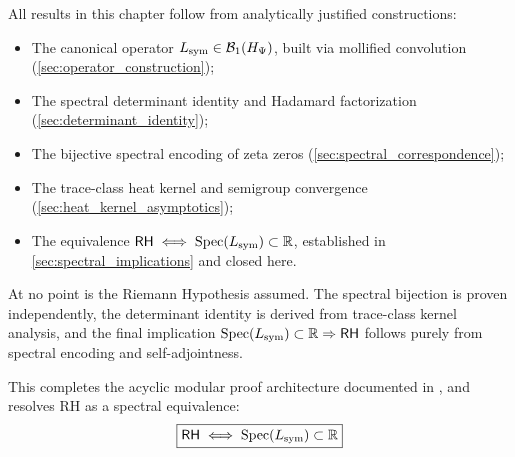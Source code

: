 \begin{remark}
\label{rem:dag_acyclic_proof_flow}

All results in this chapter follow from analytically justified constructions:
\begin{itemize}
  \item The canonical operator \( L_{\mathrm{sym}} \in \mathcal{B}_1(H_{\Psi}) \), built via mollified convolution (\cref{sec:operator_construction});
  \item The spectral determinant identity and Hadamard factorization (\cref{sec:determinant_identity});
  \item The bijective spectral encoding of zeta zeros (\cref{sec:spectral_correspondence});
  \item The trace-class heat kernel and semigroup convergence (\cref{sec:heat_kernel_asymptotics});
  \item The equivalence \( \mathsf{RH} \iff \operatorname{Spec}(L_{\mathrm{sym}}) \subset \mathbb{R} \), established in \cref{sec:spectral_implications} and closed here.
\end{itemize}

\medskip

\noindent
At no point is the Riemann Hypothesis assumed. The spectral bijection is proven independently, the determinant identity is derived from trace-class kernel analysis, and the final implication \( \operatorname{Spec}(L_{\mathrm{sym}}) \subset \mathbb{R} \Rightarrow \mathsf{RH} \) follows purely from spectral encoding and self-adjointness.

\medskip

\noindent
This completes the acyclic modular proof architecture documented in , and resolves RH as a spectral equivalence:
\[
\boxed{
\mathsf{RH} \iff \operatorname{Spec}(L_{\mathrm{sym}}) \subset \mathbb{R}
}
\]
\end{remark}
